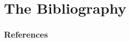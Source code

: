 \documentclass[22pt]{beamer}
\begin{document}
\section{The Bibliography}
\begin{frame}[allowframebreaks]
    \frametitle{References}
    
    
\end{frame}
\end{document}
